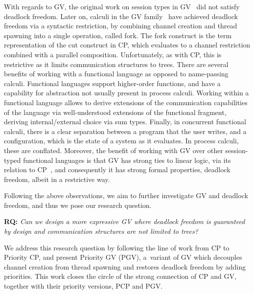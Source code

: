 \documentclass[main.tex]{subfiles}
\begin{document}
With regards to GV, the original work on session types in GV~\cite{gayvasconcelos10,gayvasconcelos12} did not satisfy deadlock freedom. Later on, calculi in the GV family~\cite{wadler14,lindleymorris15} have achieved deadlock freedom via a syntactic restriction, \ie by combining channel creation and thread spawning into a single operation, called fork. The fork construct is the term representation of the cut construct in CP, which evaluates to a channel restriction combined with a parallel composition. Unfortunately, as with CP, this is restrictive as it limits communication structures to trees. There are several benefits of working with a functional language as opposed to name-passing calculi. Functional languages support higher-order functions, and have a capability for abstraction not usually present in process calculi. Working within a functional language allows to derive extensions of the communication capabilities of the language via well-understood extensions of the functional fragment, \ie deriving internal/external choice via sum types. Finally, in concurrent functional calculi, there is a clear separation between a program that the user writes, and a configuration, which is the state of a system as it evaluates. In process calculi, these are conflated.
Moreover, the benefit of working with GV over other session-typed functional languages is that GV has strong ties to linear logic, via its relation to CP~\cite{wadler14}, and consequently it has strong formal properties, \eg deadlock freedom, albeit in a restrictive way.

Following the above observations, we aim to further investigate GV and deadlock freedom, and thus we pose our research question.

\textbf{RQ:} \emph{Can we design a more expressive GV where deadlock freedom is guaranteed by design and communication structures are not limited to trees?}

We address this research question by following the line of work from CP to Priority CP, and present
Priority GV (PGV), a~variant of GV which decouples channel creation from thread spawning and restores deadlock freedom by adding priorities. This work closes the circle of the strong connection of CP and GV, together with their priority versions, PCP and PGV.
\end{document}
